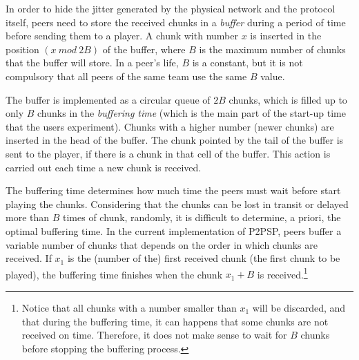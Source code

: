 
\label{sec:buffering_chunks}

In order to hide the jitter generated by the physical network and the
protocol itself, peers need to store the received chunks in a
\emph{buffer} during a period of time before sending them to a
player. A chunk with number $x$ is inserted in the position
$(x~\mathit{mod}~2B)$ of the buffer, where $B$ is the maximum number
of chunks that the buffer will store. In a peer's life, $B$ is a
constant, but it is not compulsory that all peers of the same team use
the same $B$ value.

The buffer is implemented as a circular queue of $2B$ chunks, which is
filled up to only $B$ chunks in the \emph{buffering time} (which is the main
part of the start-up time that the users experiment). Chunks with a
higher number (newer chunks) are inserted in the head of the
buffer. The chunk pointed by the tail of the buffer is sent to the
player, if there is a chunk in that cell of the buffer. This action
is carried out each time a new chunk is received.

The buffering time determines how much time the peers must wait before
start playing the chunks. Considering that the chunks can be lost in
transit or delayed more than $B$ times of chunk, randomly, it is
difficult to determine, a priori, the optimal buffering time. In the
current implementation of P2PSP, peers buffer a variable number of
chunks that depends on the order in which chunks are received. If
$x_1$ is the (number of the) first received chunk (the first chunk to
be played), the buffering time finishes when the chunk $x_1+B$ is
received.\footnote{Notice that all chunks with a number smaller than
  $x_1$ will be discarded, and that during the buffering time, it can
  happens that some chunks are not received on time. Therefore, it
  does not make sense to wait for $B$ chunks before stopping the
  buffering process.}


\begin{comment}
An heuristic that
works is the described in the Fig.~\ref{fig:DBS_peer_buffering}. As
can be seen, $\text{chunk\_to\_play}$ points to the first received
chunk, that not necessary is the received chunk with lower
index. After that, the
buffering finishes when a chunk with index $\text{chunk\_to\_play} +
\text{BUFFER\_SIZE}/2$ has been received.\footnote{This not means that
  $\text{BUFFER\_SIZE}/2$ chunks are available in the buffer.}
\end{comment}
